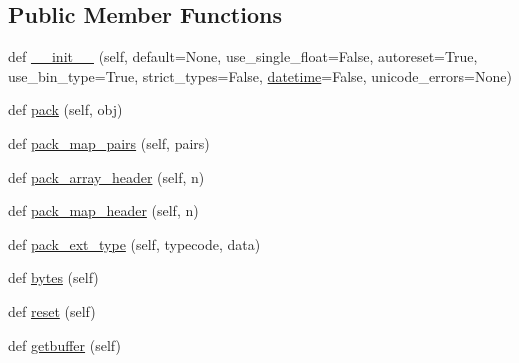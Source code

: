 \subsection*{Public Member Functions}
\begin{DoxyCompactItemize}
\item 
def \hyperlink{classpip_1_1__vendor_1_1msgpack_1_1fallback_1_1Packer_afb4700df0996c2f821598ba2f215d71e}{\+\_\+\+\_\+init\+\_\+\+\_\+} (self, default=None, use\+\_\+single\+\_\+float=False, autoreset=True, use\+\_\+bin\+\_\+type=True, strict\+\_\+types=False, \hyperlink{noprefix_8h_ac3c82bfcab9db06392d08bb501c432fc}{datetime}=False, unicode\+\_\+errors=None)
\item 
def \hyperlink{classpip_1_1__vendor_1_1msgpack_1_1fallback_1_1Packer_aa1ef61320faf8912eed4e8b20e11c59d}{pack} (self, obj)
\item 
def \hyperlink{classpip_1_1__vendor_1_1msgpack_1_1fallback_1_1Packer_aa5f0056238bef63a623d8f988bc861bf}{pack\+\_\+map\+\_\+pairs} (self, pairs)
\item 
def \hyperlink{classpip_1_1__vendor_1_1msgpack_1_1fallback_1_1Packer_ae299c5663a3f615b540a94c787bc7f0a}{pack\+\_\+array\+\_\+header} (self, n)
\item 
def \hyperlink{classpip_1_1__vendor_1_1msgpack_1_1fallback_1_1Packer_a6a49085cf25f435422ddf29f71a70bed}{pack\+\_\+map\+\_\+header} (self, n)
\item 
def \hyperlink{classpip_1_1__vendor_1_1msgpack_1_1fallback_1_1Packer_a23a92c7f1359840edf13e74819d102ff}{pack\+\_\+ext\+\_\+type} (self, typecode, data)
\item 
def \hyperlink{classpip_1_1__vendor_1_1msgpack_1_1fallback_1_1Packer_a9d155f83b76611440e9098546955c8c1}{bytes} (self)
\item 
def \hyperlink{classpip_1_1__vendor_1_1msgpack_1_1fallback_1_1Packer_a68104cad7b27fc61b98c678d5f8982fe}{reset} (self)
\item 
def \hyperlink{classpip_1_1__vendor_1_1msgpack_1_1fallback_1_1Packer_a92863e8de2789cdfbc5a9b84b9f55ed3}{getbuffer} (self)
\end{DoxyCompactItemize}


